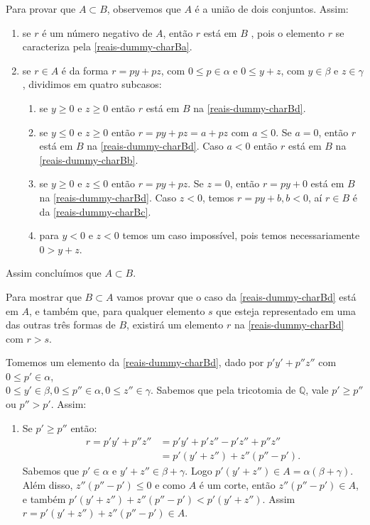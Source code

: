 \documentclass[../main.tex]{subfiles}
\begin{document}
\begin{dem}
    Para provar que $ A \subset B$, observemos que $A$ é a união de dois conjuntos. Assim:
    \begin{enumerate}
        \item se $r$ é um número negativo de $A$, então $r$ está em $B$ , pois o elemento $r$ se caracteriza pela \ref{reais-dummy-charBa}.
        \item {se $r \in A$ é da forma $r = py + pz$, com $0 \leq p \in \alpha$ e $0 \leq y+z$, com $y \in \beta$ e $z \in \gamma$, dividimos em quatro subcasos:
            \begin{enumerate}
                \item se $y \geq 0$ e $z \geq 0$ então $r$ está em $B$ na \ref{reais-dummy-charBd}.
                \item se $y \leq 0$ e $z \geq 0$ então $r = py+pz = a + pz$ com $a \leq 0$. Se $a=0$, então $r$ está em $B$ na \ref{reais-dummy-charBd}. Caso $a < 0$ então $r$ está em $B$ na \ref{reais-dummy-charBb}.
                \item se $y \geq 0$ e $z \leq 0$ então $r = py + pz$. Se $z=0$, então $r = py + 0$ está em $B$ na \ref{reais-dummy-charBd}. Caso $z<0$, temos $r=py + b, b< 0$, aí $r \in B$ é da \ref{reais-dummy-charBc}.
                \item para $y < 0$ e $z < 0$ temos um caso impossível, pois temos necessariamente $0 > y+z$.
            \end{enumerate}
        }
    \end{enumerate}

    Assim concluímos que $A \subset B$.

    Para mostrar que $B \subset A$ vamos provar que o caso da \ref{reais-dummy-charBd} está em $A$, e também que, para qualquer elemento $s$ que esteja representado em uma das outras três formas de $B$, existirá um elemento $r$ na \ref{reais-dummy-charBd} com $r > s$.  
    
    Tomemos um elemento da \ref{reais-dummy-charBd}, dado por $p'y' + p''z''$ com $0 \leq p' \in \alpha$, \\
    $ 0 \leq y' \in \beta, 0 \leq p'' \in \alpha, 0 \leq z'' \in \gamma$. 
        Sabemos que pela tricotomia de $\mathbb{Q}$, vale $p' \geq p'' $ ou $ p'' > p'$. Assim:
        \begin{enumerate}
            \item Se $p' \geq p''$ então:
                \begin{align*}
                   r= p'y' + p''z'' &= p'y' + p'z'' - p'z'' + p''z'' \\
                    &= p'(y' + z'') + z''(p''-p').
                \end{align*}
                Sabemos que $p' \in \alpha$ e $y'+z'' \in \beta+\gamma$. Logo $p'(y' + z'') \in A = \alpha (\beta+ \gamma)$. Além disso, $z''(p''-p') \leq 0$ e como $A$ é um corte, então $z''(p''-p') \in A$, e também $p'(y' + z'')+z''(p''-p') < p'(y' + z'')$. Assim $r = p'(y' + z'') + z''(p''-p') \in A$.
        

\end{enumerate}
\end{dem}
\end{document}
